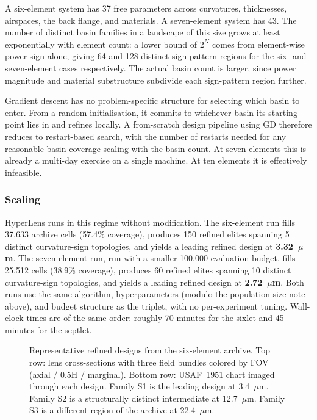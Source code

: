 A six-element system has 37 free parameters across curvatures, thicknesses, airspaces, the back flange, and materials. A seven-element system has 43. The number of distinct basin families in a landscape of this size grows at least exponentially with element count: a lower bound of $2^N$ comes from element-wise power sign alone, giving 64 and 128 distinct sign-pattern regions for the six- and seven-element cases respectively. The actual basin count is larger, since power magnitude and material substructure subdivide each sign-pattern region further.

Gradient descent has no problem-specific structure for selecting which basin to enter. From a random initialisation, it commits to whichever basin its starting point lies in and refines locally. A from-scratch design pipeline using GD therefore reduces to restart-based search, with the number of restarts needed for any reasonable basin coverage scaling with the basin count. At seven elements this is already a multi-day exercise on a single machine. At ten elements it is effectively infeasible.

\subsubsection{Scaling}

HyperLens runs in this regime without modification. The six-element run fills 37{,}633 archive cells (57.4\% coverage), produces 150 refined elites spanning 5 distinct curvature-sign topologies, and yields a leading refined design at \textbf{3.32~$\mu$m}. The seven-element run, run with a smaller 100{,}000-evaluation budget, fills 25{,}512 cells (38.9\% coverage), produces 60 refined elites spanning 10 distinct curvature-sign topologies, and yields a leading refined design at \textbf{2.72~$\mu$m}. Both runs use the same algorithm, hyperparameters (modulo the population-size note above), and budget structure as the triplet, with no per-experiment tuning. Wall-clock times are of the same order: roughly 70 minutes for the sixlet and 45 minutes for the septlet.

\begin{figure}[h]
    \centering
    \caption{Representative refined designs from the six-element archive. Top row: lens cross-sections with three field bundles colored by FOV (axial / 0.5H / marginal). Bottom row: USAF~1951 chart imaged through each design. Family S1 is the leading design at 3.4~$\mu$m. Family S2 is a structurally distinct intermediate at 12.7~$\mu$m. Family S3 is a different region of the archive at 22.4~$\mu$m.}
    \label{fig:sixlet-designs}
\end{figure}

